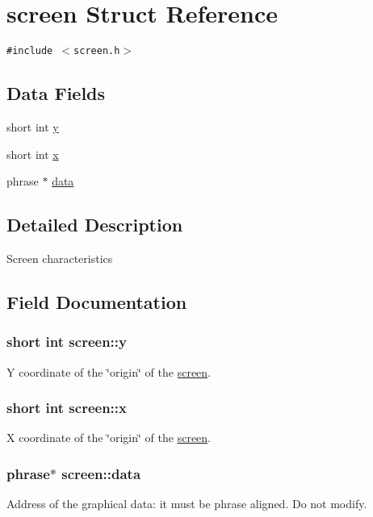 \hypertarget{structscreen}{
\section{screen Struct Reference}
\label{structscreen}
}
{\tt \#include $<$screen.h$>$}

\subsection*{Data Fields}
\begin{CompactItemize}
\item 
short int \hyperlink{structscreen_b438dd943555d059b15556708112ffec}{y}
\item 
short int \hyperlink{structscreen_a8f8245c6a73a1cc6fb26a3958ac392d}{x}
\item 
phrase $\ast$ \hyperlink{structscreen_6f1c894b02dbafcfc37cba6f7b44cd12}{data}
\end{CompactItemize}


\subsection{Detailed Description}
Screen characteristics 

\subsection{Field Documentation}
\hypertarget{structscreen_b438dd943555d059b15556708112ffec}{
\subsubsection{\setlength{\rightskip}{0pt plus 5cm}short int {\bf screen::y}}}
\label{structscreen_b438dd943555d059b15556708112ffec}


Y coordinate of the \char`\"{}origin\char`\"{} of the \hyperlink{structscreen}{screen}. \hypertarget{structscreen_a8f8245c6a73a1cc6fb26a3958ac392d}{
\subsubsection{\setlength{\rightskip}{0pt plus 5cm}short int {\bf screen::x}}}
\label{structscreen_a8f8245c6a73a1cc6fb26a3958ac392d}


X coordinate of the \char`\"{}origin\char`\"{} of the \hyperlink{structscreen}{screen}. \hypertarget{structscreen_6f1c894b02dbafcfc37cba6f7b44cd12}{
\subsubsection{\setlength{\rightskip}{0pt plus 5cm}phrase$\ast$ {\bf screen::data}}}
\label{structscreen_6f1c894b02dbafcfc37cba6f7b44cd12}


Address of the graphical data: it must be phrase aligned. Do not modify. 